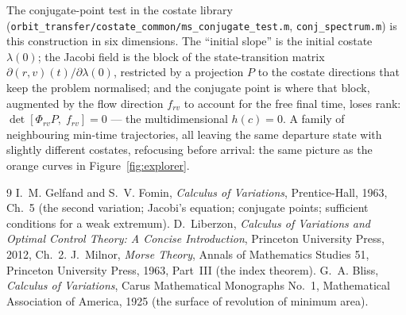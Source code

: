 \documentclass[11pt]{article}
\newcommand{\file}[1]{\texttt{#1}}
\begin{document}
The conjugate-point test in the costate library
(\file{orbit\_transfer/costate\_common/ms\_conjugate\_test.m},
\file{conj\_spectrum.m}) is this construction in six dimensions. The ``initial
slope'' is the initial costate $\lambda(0)$; the Jacobi field is the block of the
state-transition matrix $\partial(r,v)(t)/\partial\lambda(0)$, restricted by a
projection $P$ to the costate directions that keep the problem normalised; and
the conjugate point is where that block, augmented by the flow direction $f_{rv}$
to account for the free final time, loses rank:
$\det[\Phi_{rv}P,\; f_{rv}] = 0$ --- the multidimensional $h(c) = 0$. A family of
neighbouring min-time trajectories, all leaving the same departure state with
slightly different costates, refocusing before arrival: the same picture as the
orange curves in Figure~\ref{fig:explorer}.

\begin{thebibliography}{9}
 I.~M. Gelfand and S.~V. Fomin, \emph{Calculus of Variations},
Prentice-Hall, 1963, Ch.~5 (the second variation; Jacobi's equation; conjugate
points; sufficient conditions for a weak extremum).
 D.~Liberzon, \emph{Calculus of Variations and Optimal Control
Theory: A Concise Introduction}, Princeton University Press, 2012, Ch.~2.
 J.~Milnor, \emph{Morse Theory}, Annals of Mathematics Studies 51,
Princeton University Press, 1963, Part~III (the index theorem).
 G.~A. Bliss, \emph{Calculus of Variations}, Carus Mathematical
Monographs No.~1, Mathematical Association of America, 1925 (the surface of
revolution of minimum area).
\end{thebibliography}
\end{document}

